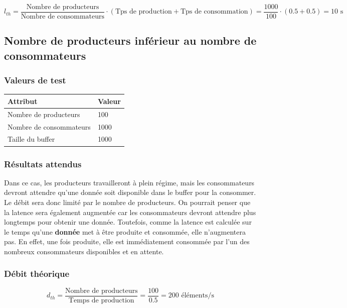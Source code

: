 \documentclass[
  french,
  a4paper,
]{scrartcl}
\begin{document}
$$
l_{th} = \frac{\text{Nombre de producteurs}}{\text{Nombre de consommateurs}} \cdot (\text{Tps de production} + \text{Tps de consommation}) = \frac{1000}{100} \cdot (0.5 + 0.5) = 10 \text{ s}
$$

\subsection{Nombre de producteurs inférieur au nombre de consommateurs}

\subsubsection*{Valeurs de test}

\begin{table}[h]
  \centering
  \begin{tabular}{l|l}
    \textbf{Attribut}  & \textbf{Valeur} \\
    \hline
    Nombre de producteurs & 100 \\
    Nombre de consommateurs & 1000 \\
    Taille du buffer & 1000 \\
  \end{tabular}
\end{table}

\subsubsection*{Résultats attendus}

Dans ce cas, les producteurs travailleront à plein régime, mais les consommateurs devront 
attendre qu'une donnée soit disponible dans le buffer pour la consommer. Le débit sera donc 
limité par le nombre de producteurs. On pourrait penser que la latence sera également augmentée 
car les consommateurs devront attendre plus longtemps pour obtenir une donnée. Toutefois,
comme la latence est calculée sur le temps qu'une \textbf{donnée} met à être produite et consommée,
elle n'augmentera pas. En effet, une fois produite, elle est immédiatement consommée par l'un 
des nombreux consommateurs disponibles et en attente. 

\subsubsection*{Débit théorique}

$$
d_{th} = \frac{\text{Nombre de producteurs}}{\text{Temps de production}} = \frac{100}{0.5} = 200 \text{ éléments/s}
$$
\end{document}
